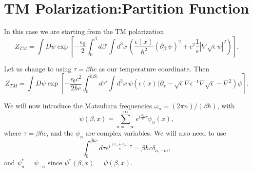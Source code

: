 \section{TM Polarization:Partition Function}

In this case we are starting from the TM polarization
\begin{equation}
Z_{TM} = \int D\psi \exp\left[ -\frac{\epsilon_0}{2}\int_0^\beta d\beta'\int d^3x\,
 \left( \frac{\epsilon(x)}{\hbar^2}(\partial_{\beta'}\psi)^2 + c^2\frac{1}{\epsilon}|\nabla\sqrt{\epsilon}\psi|^2\right)\right] .
\end{equation}

Let us change to using $\tau = \beta \hbar c$ as our temperature coordinate.  Then   
\begin{equation}
Z_{TM} = \int D\psi \exp\left[ -\frac{\epsilon_0 c^2 }{2 \hbar c}\int_0^{\hbar\beta c} 
d\tau'\int d^3x\, \psi\left( \epsilon(x)(\partial_{\tau}
  -\sqrt{\epsilon}\nabla \epsilon^{-1}\nabla\sqrt{\epsilon} -\nabla^2\right)\psi\right].
\end{equation}

We will now introduce the Matsubara frequencies $\omega_n = (2\pi n)/(\beta \hbar)$, with 
\begin{equation}
\psi(\beta,x) = \sum_{n=-\infty}^{\infty}e^{i\frac{\omega_n}{c}\tau} \psi_n(x),
\end{equation}
where $\tau = \beta\hbar c$, and the $\psi_n$ are complex variables.  We will also need to use  
\begin{equation}
\int_0^{\beta \hbar c}d\tau e^{i\frac{(\omega_n+\omega_m)}{c}\tau} = \beta\hbar c \delta_{n,-m},
\end{equation}
and $\psi_n^* = \psi_{-n}$ since $\psi^*(\beta, x) = \psi(\beta, x)$.  

